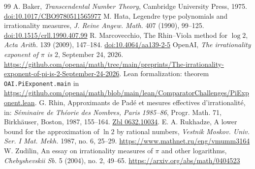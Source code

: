 \documentclass[11pt]{amsart}
\newcommand{\doi}[1]{\href{https://doi.org/#1}{doi:#1}}
\begin{document}
\begin{thebibliography}{99}
 A. Baker, \emph{Transcendental Number Theory}, Cambridge University Press, 1975. \doi{10.1017/CBO9780511565977}
 M. Hata, Legendre type polynomials and irrationality measures, \emph{J. Reine Angew. Math.} 407 (1990), 99--125. \doi{10.1515/crll.1990.407.99}
 R. Marcovecchio, The Rhin--Viola method for $\log2$, \emph{Acta Arith.} 139 (2009), 147--184. \doi{10.4064/aa139-2-5}
 OpenAI, \emph{The irrationality exponent of $\pi$ is $2$}, September 24, 2026. \url{https://github.com/openai/math/tree/main/preprints/The-irrationality-exponent-of-pi-is-2-September-24-2026}. Lean formalization: theorem \texttt{OAI.PiExponent.main} in \url{https://github.com/openai/math/blob/main/lean/ComparatorChallenges/PiExponent.lean}.
 G. Rhin, Approximants de Pad\'e et mesures effectives d'irrationalit\'e, in: \emph{S\'eminaire de Th\'eorie des Nombres, Paris 1985--86}, Progr. Math. 71, Birkh\"auser, Boston, 1987, 155--164. \href{https://zbmath.org/0632.10034}{Zbl 0632.10034}.
 E. A. Rukhadze, A lower bound for the approximation of $\ln2$ by rational numbers, \emph{Vestnik Moskov. Univ. Ser. I Mat. Mekh.} 1987, no. 6, 25--29. \url{https://www.mathnet.ru/eng/vmumm3164}
 W. Zudilin, An essay on irrationality measures of $\pi$ and other logarithms, \emph{Chebyshevskii Sb.} 5 (2004), no. 2, 49--65. \url{https://arxiv.org/abs/math/0404523}
\end{thebibliography}
\end{document}
